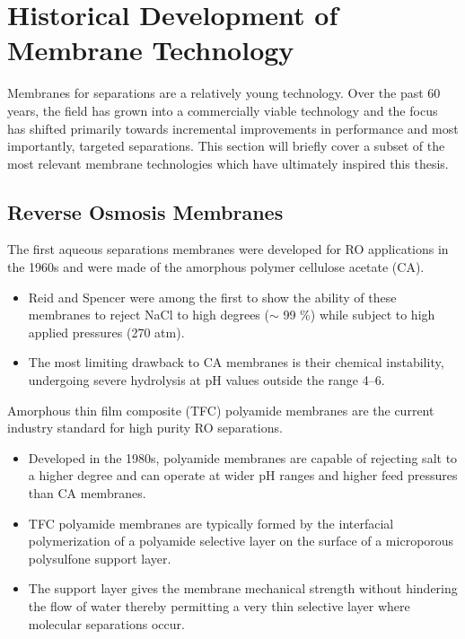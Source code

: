   \section{Historical Development of Membrane Technology}
  
  Membranes for separations are a relatively young technology. Over the past 60 years, 
  the field has grown into a commercially viable technology and the focus has shifted
  primarily towards incremental improvements in performance and most importantly,
  targeted separations. This section will briefly cover a subset of the most relevant
  membrane technologies which have ultimately inspired this thesis.
  
  \subsection{Reverse Osmosis Membranes}
  
  The first aqueous separations membranes were developed for RO applications 
  in the 1960s and were made of the amorphous polymer cellulose acetate (CA).~\cite{kesting_semipermeable_1965}
  \begin{itemize}
    \item Reid and Spencer were among the first to show the ability of
    these membranes to reject NaCl to high degrees ($\sim$ 99 \%) while subject 
    to high applied pressures (270 atm).~\cite{reid_ultrafiltration_1960}
    \item The most limiting drawback to CA membranes is their chemical instability, 
    undergoing severe hydrolysis at pH values outside the range 4--6.~\cite{vos_kinetic_1966}
  \end{itemize}
  
  Amorphous thin film composite (TFC) polyamide membranes are the current industry 
  standard for high purity RO separations.~\cite{baker_membrane_2012}
  \begin{itemize}  
    \item Developed in the 1980s, polyamide membranes are capable of rejecting salt
    to a higher degree and can operate at wider pH ranges and higher feed pressures than 
    CA membranes.~\cite{cadotte_interfacial_1981}
    \item TFC polyamide membranes are typically formed by the interfacial polymerization
    of a polyamide selective layer on the surface of a microporous polysulfone support 
    layer.    
    \item The support layer gives the membrane mechanical strength without hindering the
    flow of water thereby permitting a very thin selective layer where molecular 
    separations occur.~\cite{kucera_biofouling_2019}
  \end{itemize}
  
